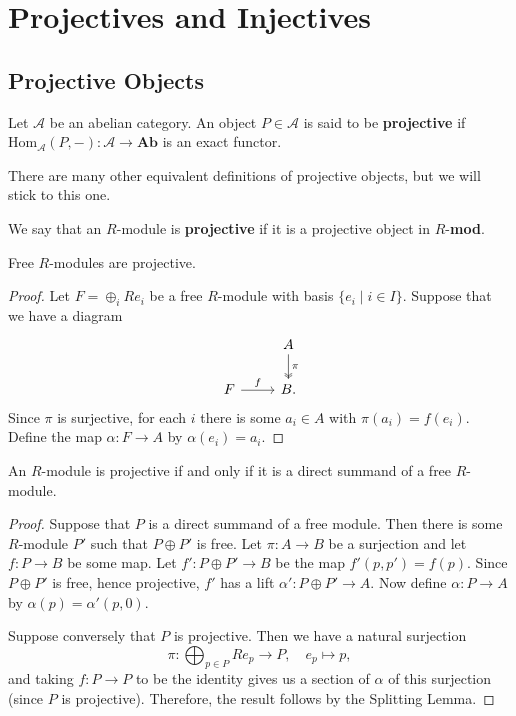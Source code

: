 \section{Projectives and Injectives} %
\label{sec:Projectives and Injectives}
\subsection{Projective Objects} %
\label{sub:Projective Objects}
\begin{definition}
  Let $ \mathcal{A} $ be an abelian category. An object $ P \in \mathcal{A} $ is said to be \textbf{projective} if $ \text{Hom}_{\mathcal{A}}(P, -): \mathcal{A} \to \mathbf{Ab} $ is an exact functor.
\end{definition}
There are many other equivalent definitions of projective objects, but we will stick to this one.

\begin{definition}
  We say that an $ R $-module is \textbf{projective} if it is a projective object in $ R $-\textbf{mod}.
\end{definition}

\begin{lemma}
  Free $ R $-modules are projective.
\end{lemma}
\begin{proof}
  Let $ F = \oplus_{i}Re_i $ be a free $ R $-module with basis $ \{e_i \mid i \in I\} $. Suppose that we have a diagram
  \[\begin{tikzcd}
	& A \\
	  F & B.
	  \arrow["f", from=2-1, to=2-2]
	  \arrow["\pi", two heads, from=1-2, to=2-2]
  \end{tikzcd}\]
  Since $ \pi $ is surjective, for each $ i $ there is some $ a_i \in A $ with $ \pi(a_i)=f(e_i) $. Define the map $ \alpha: F \to A $ by $ \alpha(e_i)=a_i $.
\end{proof}

\begin{lemma}
  An $ R $-module is projective if and only if it is a direct summand of a free $ R $-module.
\end{lemma}
\begin{proof}
  Suppose that $ P $ is a direct summand of a free module. Then there is some $ R $-module $ P' $ such that $ P \oplus P' $ is free. Let $ \pi: A \to B $ be a surjection and let $ f: P \to B $ be some map. Let $ f': P \oplus P' \to B $ be the map $ f'(p,p')=f(p) $. Since $ P \oplus P' $ is free, hence projective, $ f' $ has a lift $ \alpha': P \oplus P' \to A $. Now define $ \alpha: P \to A $ by $ \alpha(p)= \alpha'(p, 0) $.

  Suppose conversely that $ P $ is projective. Then we have a natural surjection
  \begin{equation*}
  \pi: \bigoplus_{p \in P} Re_p \to P, \quad e_p \mapsto p,
  \end{equation*}
  and taking $ f: P \to P $ to be the identity gives us a section of $ \alpha $ of this surjection (since $ P $ is projective). Therefore, the result follows by the Splitting Lemma.
\end{proof}

